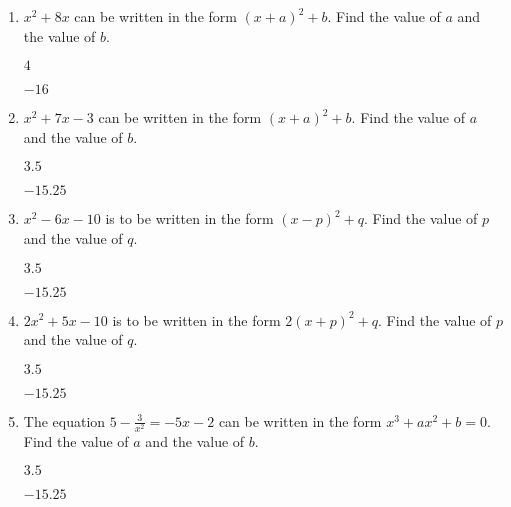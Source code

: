 \begin{enumerate}%

\item $x^2+8x$ can be written in the form $(x+a)^2+b$. Find the value of $a$ and the value of $b$.
    \begin{envAnswer}[blankline=3]         $     4          $ \end{envAnswer}
    \begin{envAnswer}[blankline=0]         $   -16          $ \end{envAnswer}


\item $x^2+7x -3$ can be written in the form $(x+a)^2+b$. Find the value of $a$ and the value of $b$.
    \begin{envAnswer}[blankline=3]         $     3.5        $ \end{envAnswer}
    \begin{envAnswer}[blankline=0]         $   -15.25       $ \end{envAnswer}


\item $x^2-6x -10$ is to be written in the form $(x-p)^2+q$. Find the value of $p$ and the value of $q$.
    \begin{envAnswer}[blankline=3]         $     3.5        $ \end{envAnswer}
    \begin{envAnswer}[blankline=0]         $   -15.25       $ \end{envAnswer}


\item $2x^2+5x -10$ is to be written in the form $2(x+p)^2+q$. Find the value of $p$ and the value of $q$.
    \begin{envAnswer}[blankline=3]         $     3.5        $ \end{envAnswer}
    \begin{envAnswer}[blankline=0]         $   -15.25       $ \end{envAnswer}


\item The equation $5-\frac{3}{x^2}=-5x-2$ can be written in the form $x^3+ax^2+b=0$. Find the value of $a$ and the value of $b$.
    \begin{envAnswer}[blankline=3]         $     3.5        $ \end{envAnswer}
    \begin{envAnswer}[blankline=0]         $   -15.25       $ \end{envAnswer}




\end{enumerate}



